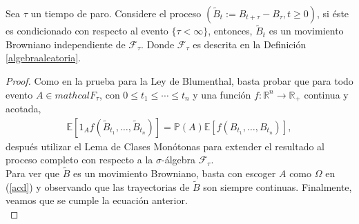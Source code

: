 \begin{theorem}
Sea $\tau$ un tiempo de paro. Considere el proceso $(\tilde{B}_t := B_{t + \tau} - B_{\tau}, t \geq 0)$, si éste es condicionado con respecto al evento $\{ \tau < \infty \}$, entonces, $\tilde{B}_t$ es un movimiento Browniano independiente de $\mathcal{F}_{\tau}$. Donde $\mathcal{F}_{\tau}$ es descrita en la Definición \ref{algebraaleatoria}.
\end{theorem}
\begin{proof}
Como en la prueba para la Ley de Blumenthal, basta probar que para todo evento $A \in mathcal{F}_{\tau}$, con $0 \leq t_1 \leq \cdots \leq t_n$ y una función $f : \mathbb{R}^n \rightarrow \mathbb{R}_{+}$ continua y acotada, 
	\begin{align}
	\mathbb{E} \left[ 1_A f \left( \tilde{B}_{t_1}, \ldots, \tilde{B}_{t_n} \right) \right] = \mathbb{P} (A) \mathbb{E} \left[ f \left( B_{t_1}, \ldots, B_{t_n} \right) \right], \label{acd}
	\end{align}
después utilizar el Lema de Clases Monótonas para extender el resultado al proceso completo con respecto a la $\sigma$-álgebra $\mathcal{F}_{\tau}$. \\

Para ver que $\tilde{B}$ es un movimiento Browniano, basta con escoger $A$ como $\Omega$ en (\ref{acd}) y observando que las trayectorias de $\tilde{B}$ son siempre continuas. Finalmente, veamos que se cumple la ecuación anterior. \\


\end{proof}
